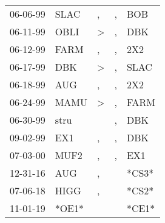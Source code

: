 \begin{supertabular}{p{0.07\textwidth}p{0.06\textwidth}p{0.02\textwidth}p{0.02\textwidth}p{0.06\textwidth}}
 06-06-99\textsuperscript{} &  SLAC\textsuperscript{} &             , &  , &   BOB\textsuperscript{} \\
 06-11-99\textsuperscript{} &  OBLI\textsuperscript{} &  \textgreater &  , &   DBK\textsuperscript{} \\
 06-12-99\textsuperscript{} &  FARM\textsuperscript{} &             , &  , &   2X2\textsuperscript{} \\
 06-17-99\textsuperscript{} &   DBK\textsuperscript{} &  \textgreater &  , &  SLAC\textsuperscript{} \\
 06-18-99\textsuperscript{} &   AUG\textsuperscript{} &             , &  , &   2X2\textsuperscript{} \\
 06-24-99\textsuperscript{} &  MAMU\textsuperscript{} &  \textgreater &  , &  FARM\textsuperscript{} \\
 06-30-99\textsuperscript{} &  stru\textsuperscript{} &               &  , &   DBK\textsuperscript{} \\
 09-02-99\textsuperscript{} &   EX1\textsuperscript{} &             , &  , &   DBK\textsuperscript{} \\
 07-03-00\textsuperscript{} &  MUF2\textsuperscript{} &             , &  , &   EX1\textsuperscript{} \\
 12-31-16\textsuperscript{} &   AUG\textsuperscript{} &             , &    &                   *CS3* \\
 07-06-18\textsuperscript{} &  HIGG\textsuperscript{} &             , &    &                   *CS2* \\
 11-01-19\textsuperscript{} &                   *OE1* &               &    &                   *CE1* \\
\end{supertabular}
